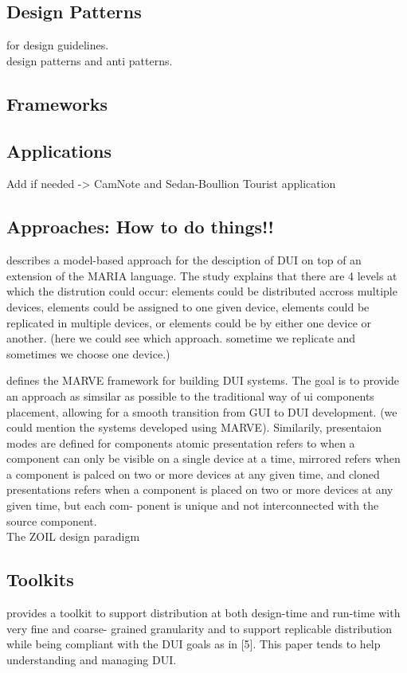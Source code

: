 \subsection{Design Patterns}
\cite{vanderdonckt2010distributed} for design guidelines.\\
\cite{seifried2011lessons} design patterns and anti patterns.

\subsection{Frameworks}

\subsection{Applications}
Add if needed -> \cite{demeure20084c} CamNote and  Sedan-Boullion Tourist
application

\subsection{Approaches: How to do things!!}
\cite{manca2011distributing} describes a model-based approach for the desciption
of DUI on top of an extension of the MARIA language. The study explains that
there are 4 levels at which the distrution could occur: elements could be
distributed accross multiple devices, elements could be assigned to one given
device, elements could be replicated in multiple devices, or elements could be
by either one device or another. (here we could see which approach. sometime we
replicate and sometimes we choose one device.)

\cite{froberg2011model} defines the MARVE framework for building DUI
systems. The goal is to provide an approach as simsilar as possible to
the traditional way of ui components placement, allowing for a smooth
transition from GUI to DUI development. (we could mention the systems
developed using MARVE). Similarily, presentaion modes are defined for components
atomic presentation refers to when a component can only be visible on a single
device at a time, mirrored refers when a component is palced on two or more
devices at any given time, and cloned presentations refers when a component is
placed on two or more devices at any given time, but each com- ponent is unique
and not interconnected with the source component.\\

The ZOIL design paradigm \cite{jetter2012design}
 
\subsection{Toolkits}
\cite{melchior2011distribution} provides a toolkit to support distribution
at both design-time and run-time with very fine and coarse- grained granularity and to support replicable distribution while being compliant with the DUI goals as in [5]. This paper tends to help understanding and managing DUI.\\


